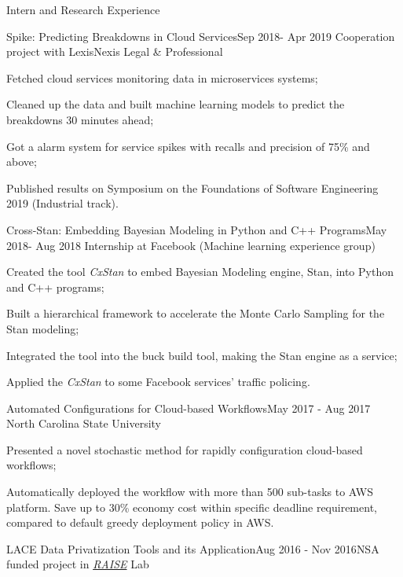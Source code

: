 \documentclass{resume} %
\begin{document}
\begin{rSection}{Intern and Research Experience}
\begin{rSubsection}{Spike: Predicting Breakdowns in Cloud Services}{Sep 2018- Apr 2019}
{Cooperation project with LexisNexis Legal \& Professional}{}
\item Fetched cloud services monitoring data in microservices systems;
\item Cleaned up the data and built machine learning models to predict the breakdowns 30 minutes ahead;
\item Got a alarm system for service spikes with recalls and precision of 75\% and above;
\item Published results on Symposium on the Foundations of Software Engineering 2019 (Industrial track).
\end{rSubsection}


\begin{rSubsection}{Cross-Stan: Embedding Bayesian Modeling in Python and C++ Programs}{May 2018- Aug 2018}
{Internship at Facebook (Machine learning experience group)}{}
\item Created the tool {\it CxStan} to embed Bayesian Modeling engine, Stan, into Python and C++ programs;
\item Built a hierarchical framework to accelerate the  Monte Carlo Sampling for the Stan modeling;
\item Integrated the tool into the buck build tool, making the Stan engine as a service;
\item Applied the {\it CxStan} to some Facebook services' traffic policing.
\end{rSubsection}

\begin{rSubsection}{Automated Configurations for Cloud-based Workflows}{May 2017 - Aug 2017}
{North Carolina State University}{}
\item Presented a novel stochastic method for rapidly configuration cloud-based workflows;
\item Automatically deployed the workflow with more than 500 sub-tasks to AWS platform. Save up to 30\% economy cost within specific deadline requirement, compared to default greedy deployment policy in AWS.
\end{rSubsection}

\begin{rSubsection}{LACE Data Privatization Tools and its Application}{Aug 2016 - Nov 2016}{NSA funded project in \href{http://ai4se.net/index}{\textit{RAISE}} Lab}{}


\end{rSubsection}
\end{rSection}
\end{document}
